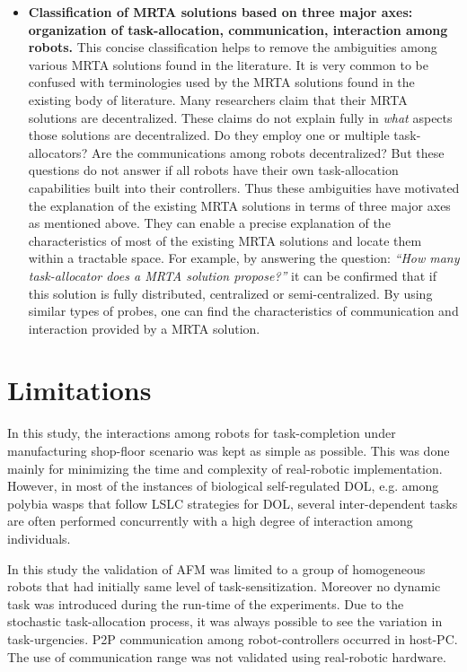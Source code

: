 \begin{itemize}
\item \textbf{Classification of MRTA solutions based on three major axes: organization of task-allocation, communication, interaction among robots.} This concise classification helps to remove the ambiguities among various MRTA solutions found in the literature.  It is very common to be confused with terminologies used by the MRTA solutions found in the existing body of literature. Many researchers claim that their MRTA solutions are decentralized. These claims do not explain fully in \textit{what} aspects those solutions are decentralized. Do they employ one or multiple task-allocators? Are the communications among robots decentralized? But these questions do not answer if all robots have their own task-allocation capabilities built into their controllers. Thus these ambiguities have motivated the explanation of the existing MRTA solutions in terms of three major axes as mentioned above. They can enable a precise  explanation of the characteristics of most of the existing MRTA solutions and locate them within a tractable space. For example, by answering the question: \textit{``How many task-allocator does a MRTA solution propose?''} it can be confirmed that if this solution is fully distributed, centralized or semi-centralized. By using similar types of probes, one can find the characteristics of communication and interaction provided by a MRTA solution.
\end{itemize}
\section{Limitations}
In this study, the interactions among robots for task-completion  under manufacturing shop-floor scenario was kept as simple as possible. This was done mainly for minimizing the time and complexity of real-robotic implementation. However, in most of the instances of biological self-regulated DOL, e.g. among polybia wasps that follow LSLC strategies for DOL, several inter-dependent tasks are often performed concurrently with a high degree of interaction among individuals. 

In this study the validation of AFM was limited to a group of homogeneous robots that had initially same level of task-sensitization. Moreover no dynamic task was introduced during the run-time of the experiments. Due to the stochastic task-allocation process, it was always possible to see the  variation in task-urgencies. P2P communication among robot-controllers occurred in host-PC. The use of communication range was not validated using real-robotic hardware. 

